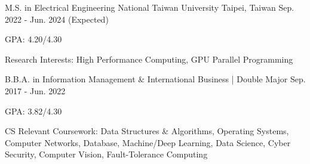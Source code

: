 

\begin{cventries}

  \cventry
    {M.S. in Electrical Engineering} %
    {National Taiwan University} %
    {Taipei, Taiwan} %
    {Sep. 2022 - Jun. 2024 (Expected)} %
    {
      \begin{cvitems} %
        \item {GPA: 4.20/4.30}
        \item {Research Interests: High Performance Computing, GPU Parallel Programming}
      \end{cvitems}
    }

  \cventry
    {B.B.A. in Information Management \& International Business | Double Major} %
    {} %
    {} %
    {Sep. 2017 - Jun. 2022} %
    {
      \begin{cvitems}
        \item GPA: 3.82/4.30
        \item {CS Relevant Coursework: Data Structures \& Algorithms, Operating Systems, Computer Networks, Database, Machine/Deep Learning, Data Science, Cyber Security, Computer Vision, Fault-Tolerance Computing}
      \end{cvitems}
    }
\end{cventries}
